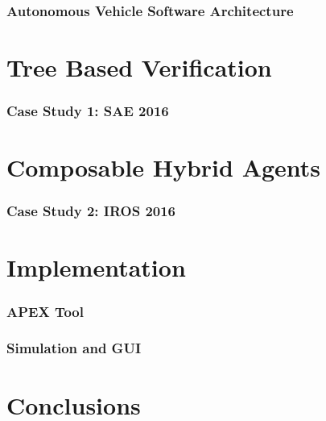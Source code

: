 \documentclass[11pt]{article}              %
\begin{document}
\section{Autonomous Vehicle Software Architecture}



\pagebreak
\part{Tree Based Verification}
\section{Case Study 1: SAE 2016}

\pagebreak
\part{Composable Hybrid Agents}
\section{Case Study 2: IROS 2016}

\part{Implementation}
\section{APEX Tool}

\section{Simulation and GUI}

\pagebreak
\part{Conclusions}


\pagebreak


 
\end{document}
